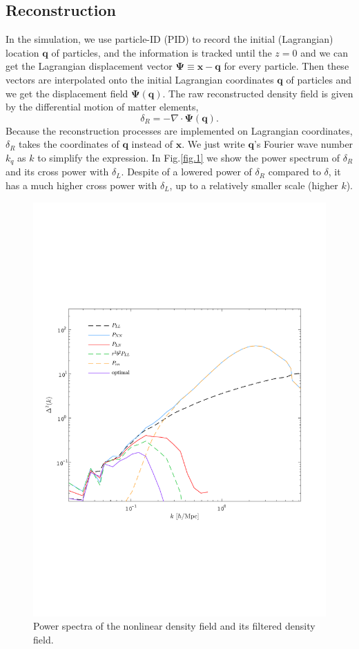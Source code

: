 \documentclass[aps,prd,twocolumn,superscriptaddress,amsfont,amssymb,amsmath,nofootinbib,showpacs,balancelastpage]{revtex4-1}
\newcommand{\bs}{\boldsymbol}
\begin{document}
\subsection{Reconstruction}\label{ss.reco}
In the simulation, we use particle-ID (PID) to record the initial (Lagrangian) location ${\bs 
q}$ of particles, and the information is tracked until the $z=0$ and we can get the 
Lagrangian displacement vector ${\bs \Psi}\equiv{\bs x}-{\bs q}$ for every 
particle. Then these vectors are interpolated onto the initial Lagrangian 
coordinates ${\bs q}$ of particles and we get the displacement field ${\bs \Psi}
({\bs q})$.
The raw reconstructed density field is given by the differential motion of matter 
elements,
\begin{equation}
    \delta_R=-\nabla\cdot{\bs \Psi}({\bs q}).
\end{equation}
Because the reconstruction processes are implemented on Lagrangian coordinates,
$\delta_R$ takes the coordinates of $\bs q$ instead of $\bs x$.
We just write $\bs q$'s Fourier wave number
$k_q$ as $k$ to simplify the expression.
In Fig.\ref{fig.1} we show the power spectrum of $\delta_R$ and its cross power
with $\delta_L$. Despite of a lowered power of $\delta_R$ compared to $\delta$, it has a much higher 
cross power with $\delta_L$, up to a relatively smaller scale (higher $k$).
\begin{figure}[t] \centering
  \includegraphics[width=1.0\linewidth]{fig3.pdf}
  \caption{Power spectra of the nonlinear density field and its
  filtered density field.}
  \label{fig.3}
\end{figure}
\end{document}
